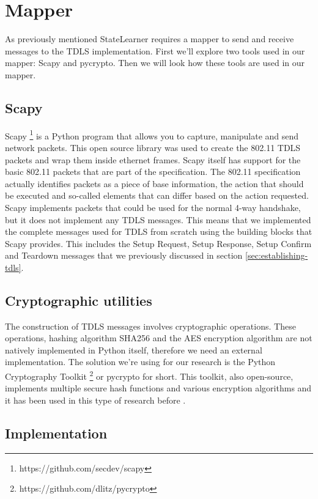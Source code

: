 \section{Mapper}

As previously mentioned StateLearner requires a mapper to send and receive messages to the TDLS implementation. First we'll explore two tools used in our mapper: Scapy and pycrypto. Then we will look how these tools are used in our mapper.

\subsection{Scapy}

Scapy \footnote{https://github.com/secdev/scapy} is a Python program that allows you to capture, manipulate and send network packets. This open source library was used to create the 802.11 TDLS packets and wrap them inside ethernet frames. Scapy itself has support for the basic 802.11 packets that are part of the specification. The 802.11 specification actually identifies packets as a piece of base information, the action that should be executed and so-called elements that can differ based on the action requested. Scapy implements packets that could be used for the normal 4-way handshake, but it does not implement any TDLS messages.
This means that we implemented the complete messages used for TDLS from scratch using the building blocks that Scapy provides. This includes the Setup Request, Setup Response, Setup Confirm and Teardown messages that we previously discussed in section \ref{sec:establishing-tdls}.

\subsection{Cryptographic utilities}

The construction of TDLS messages involves cryptographic operations. These operations, hashing algorithm SHA256 and the AES encryption algorithm are not natively implemented in Python itself, therefore we need an external implementation. The solution we're using for our research is the Python Cryptography Toolkit \footnote{https://github.com/dlitz/pycrypto} or pycrypto for short. This toolkit, also open-source, implements multiple secure hash functions and various encryption algorithms and it has been used in this type of research before \cite{Vanhoef:2017,Veldhuizen:2017}.

\subsection{Implementation}

